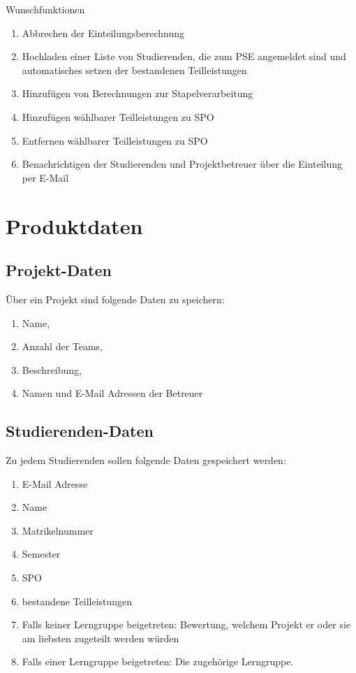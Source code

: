 \documentclass[parskip=full]{scrartcl}
\newcommand{\swtLabel}[1]{\textbf{\textbackslash #1\arabic*0\textbackslash}}
\begin{document}
Wunschfunktionen

\begin{enumerate}[label=\swtLabel{FA}, resume]
  \item Abbrechen der Einteilungsberechnung
  \item Hochladen einer Liste von Studierenden, die zum PSE angemeldet sind
	    und automatisches setzen der bestandenen Teilleistungen
  \item Hinzufügen von Berechnungen zur Stapelverarbeitung
  \item Hinzufügen wählbarer Teilleistungen zu SPO
  \item Entfernen wählbarer Teilleistungen zu SPO
  \item Benachrichtigen der Studierenden und Projektbetreuer über die Einteilung per E-Mail
\end{enumerate}

\section{Produktdaten}

\subsection{Projekt-Daten} 
Über ein Projekt sind folgende Daten zu speichern:
\begin{enumerate}[label=\swtLabel{D}] 
  \item Name,
  \item Anzahl der Teams,
  \item Beschreibung,
  \item Namen und E-Mail Adressen der Betreuer
\end{enumerate}
\subsection{Studierenden-Daten} 
Zu jedem Studierenden sollen folgende Daten gespeichert werden:
\begin{enumerate}[label=\swtLabel{D}, resume] 
  \item E-Mail Adresse
  \item Name
  \item Matrikelnummer
  \item Semester
  \item SPO
  \item bestandene Teilleistungen
  \item Falls keiner Lerngruppe beigetreten: Bewertung, welchem Projekt er oder
  sie am liebsten zugeteilt werden würden
  \item Falls einer Lerngruppe beigetreten: Die zugehörige Lerngruppe.
\end{enumerate}
\end{document}

